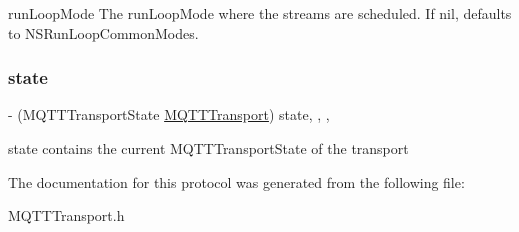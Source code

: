 run\+Loop\+Mode The run\+Loop\+Mode where the streams are scheduled. If nil, defaults to N\+S\+Run\+Loop\+Common\+Modes. \mbox{\label{protocol_m_q_t_t_transport_01-p_a599b4d50a3951a9effaa08895b45f340}} 
\subsubsection{\texorpdfstring{state}{state}}
{\footnotesize\ttfamily -\/ (M\+Q\+T\+T\+Transport\+State \hyperlink{interface_m_q_t_t_transport}{M\+Q\+T\+T\+Transport}) state\hspace{0.3cm}{\ttfamily [read]}, {\ttfamily [write]}, {\ttfamily [nonatomic]}, {\ttfamily [assign]}}

state contains the current M\+Q\+T\+T\+Transport\+State of the transport 

The documentation for this protocol was generated from the following file\+:\begin{DoxyCompactItemize}
\item 
M\+Q\+T\+T\+Transport.\+h\end{DoxyCompactItemize}
